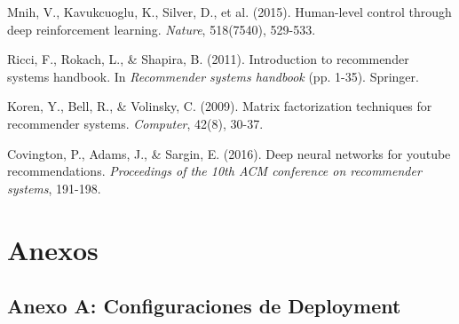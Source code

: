 \begin{thebibliography}{99}
Mnih, V., Kavukcuoglu, K., Silver, D., et al. (2015). Human-level control through deep reinforcement learning. \textit{Nature}, 518(7540), 529-533.

Ricci, F., Rokach, L., \& Shapira, B. (2011). Introduction to recommender systems handbook. In \textit{Recommender systems handbook} (pp. 1-35). Springer.

Koren, Y., Bell, R., \& Volinsky, C. (2009). Matrix factorization techniques for recommender systems. \textit{Computer}, 42(8), 30-37.

Covington, P., Adams, J., \& Sargin, E. (2016). Deep neural networks for youtube recommendations. \textit{Proceedings of the 10th ACM conference on recommender systems}, 191-198.

\end{thebibliography}

\section*{Anexos}

\subsection*{Anexo A: Configuraciones de Deployment}

